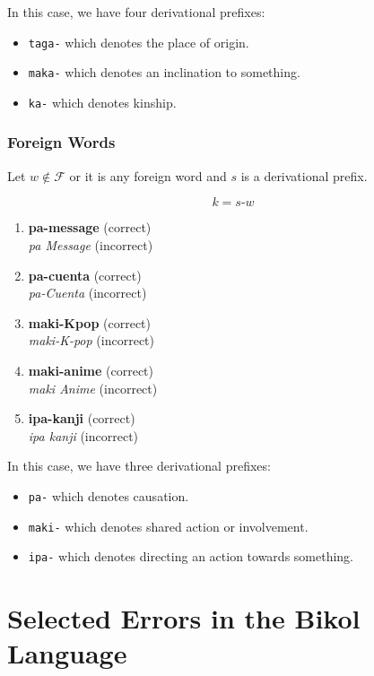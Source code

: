 In this case, we have four derivational prefixes:
\begin{itemize}
    \item \texttt{taga-} which denotes the place of origin.
    \item \texttt{maka-} which denotes an inclination to something.
    \item \texttt{ka-} which denotes kinship.
\end{itemize}

\subsubsection{Foreign Words}
Let \(w \notin \mathcal{F}\) or it is any foreign word and $s$ is a derivational prefix.

\[
      k = s\texttt{-}w
\]

\begin{example}
\end{example}
\begin{enumerate}
      \item \textbf{pa-message} (correct) \\
            \textit{pa Message} (incorrect)
      \item \textbf{pa-cuenta} (correct) \\
            \textit{pa-Cuenta} (incorrect)
      \item \textbf{maki-Kpop} (correct) \\
            \textit{maki-K-pop} (incorrect)
      \item \textbf{maki-anime} (correct) \\
            \textit{maki Anime} (incorrect)
      \item \textbf{ipa-kanji} (correct) \\
            \textit{ipa kanji} (incorrect)
\end{enumerate}

In this case, we have three derivational prefixes:
\begin{itemize}
    \item \texttt{pa-} which denotes causation.
    \item \texttt{maki-} which denotes shared action or involvement.
    \item \texttt{ipa-} which denotes directing an action towards something.
\end{itemize}

\section{Selected Errors in the Bikol Language}
